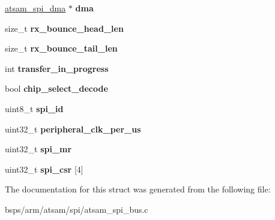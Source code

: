 \begin{DoxyCompactItemize}
\mbox{\label{structatsam__spi__bus_a09ed7dcedc1bb651f12ebc28187ffb79}} 
\mbox{\hyperlink{structatsam__spi__dma}{atsam\+\_\+spi\+\_\+dma}} $\ast$ {\bfseries dma}
\item 
\mbox{\label{structatsam__spi__bus_ace15a33ca3465c4e3a9d0cea664de346}} 
size\+\_\+t {\bfseries rx\+\_\+bounce\+\_\+head\+\_\+len}
\item 
\mbox{\label{structatsam__spi__bus_a37f1a8024f0352e3456d85b0de5bff9b}} 
size\+\_\+t {\bfseries rx\+\_\+bounce\+\_\+tail\+\_\+len}
\item 
\mbox{\label{structatsam__spi__bus_a9c55b7f0d5ba8b494e3ded1ffaea13f9}} 
int {\bfseries transfer\+\_\+in\+\_\+progress}
\item 
\mbox{\label{structatsam__spi__bus_a1c1606990df8f6d07e9ec37da6890f3b}} 
bool {\bfseries chip\+\_\+select\+\_\+decode}
\item 
\mbox{\label{structatsam__spi__bus_a3e5a0f56fd67138ff028fc5a56f11110}} 
uint8\+\_\+t {\bfseries spi\+\_\+id}
\item 
\mbox{\label{structatsam__spi__bus_a65fbb7c49569833d668a611c10ebe9b5}} 
uint32\+\_\+t {\bfseries peripheral\+\_\+clk\+\_\+per\+\_\+us}
\item 
\mbox{\label{structatsam__spi__bus_a4b15f8e26a229fa47dea57b7e57b9afc}} 
uint32\+\_\+t {\bfseries spi\+\_\+mr}
\item 
\mbox{\label{structatsam__spi__bus_a8e34e76cdaf9ca84c4ca512b17664b3a}} 
uint32\+\_\+t {\bfseries spi\+\_\+csr} \mbox{[}4\mbox{]}
\end{DoxyCompactItemize}


The documentation for this struct was generated from the following file\+:\begin{DoxyCompactItemize}
\item 
bsps/arm/atsam/spi/atsam\+\_\+spi\+\_\+bus.\+c\end{DoxyCompactItemize}
